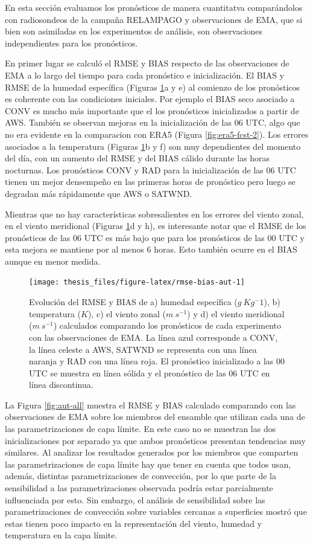 \documentclass[12pt,oneside,a4paper]{reedthesis}
\begin{document}
En esta sección evaluamos los pronósticos de manera cuantitatva comparándolos con radiosondeos de la campaña RELAMPAGO y observaciones de EMA, que si bien son asimiladas en los experimentos de análisis, son observaciones independientes para los pronósticos.

En primer lugar se calculó el RMSE y BIAS respecto de las observaciones de EMA a lo largo del tiempo para cada pronóstico e inicialización. El BIAS y RMSE de la humedad específica (Figuras \ref{fig:rmse-bias-aut}a y e) al comienzo de los pronósticos es coherente con las condiciones iniciales. Por ejemplo el BIAS seco asociado a CONV es mucho más importante que el los pronósticos inicializados a partir de AWS. También se observan mejoras en la inicialización de las 06 UTC, algo que no era evidente en la comparacion con ERA5 (Figura \ref{fig:era5-fcst-2}). Los errores asociados a la temperatura (Figuras \ref{fig:rmse-bias-aut}b y f) son muy dependientes del momento del día, con un aumento del RMSE y del BIAS cálido durante las horas nocturnas. Los pronósticos CONV y RAD para la inicialización de las 06 UTC tienen un mejor densempeño en las primeras horas de pronóstico pero luego se degradan más rápidamente que AWS o SATWND.

Mientras que no hay características sobresalientes en los errores del viento zonal, en el viento meridional (Figuras \ref{fig:rmse-bias-aut}d y h), es interesante notar que el RMSE de los pronósticos de las 06 UTC es más bajo que para los pronósticos de las 00 UTC y esta mejora se mantiene por al menos 6 horas. Esto también ocurre en el BIAS aunque en menor medida.


\begin{figure}
\texttt{[image: thesis\_files/figure-latex/rmse-bias-aut-1]} \caption{Evolución del RMSE y BIAS de a) humedad específica (\(g\ Kg{^-1}\)), b) temperatura (\(K\)), c) el viento zonal (\(m\ s^{-1}\)) y d) el viento meridional (\(m\ s^{-1}\)) calculados comparando los pronósticos de cada experimento con las observaciones de EMA. La línea azul corresponde a CONV, la línea celeste a AWS, SATWND se representa con una línea naranja y RAD con una línea roja. El pronóstico inicializado a las 00 UTC se muestra en línea sólida y el pronóstico de las 06 UTC en línea discontinua.}\label{fig:rmse-bias-aut}
\end{figure}
La Figura \ref{fig:aut-all} muestra el RMSE y BIAS calculado comparando con las observaciones de EMA sobre los miembros del ensamble que utilizan cada una de las parametrizaciones de capa límite. En este caso no se muestran las dos inicializaciones por separado ya que ambos pronósticos presentan tendencias muy similares. Al analizar los resultados generados por los miembros que comparten las parametrizaciones de capa límite hay que tener en cuenta que todos usan, además, distintas parametrizaciones de convección, por lo que parte de la sensibilidad a las parametrizaciones observada podría estar parcialmente influenciada por esto. Sin embargo, el análisis de sensibilidad sobre las parametrizaciones de convección sobre variables cercanas a superficies mostró que estas tienen poco impacto en la representación del viento, humedad y temperatura en la capa límite.
\end{document}
